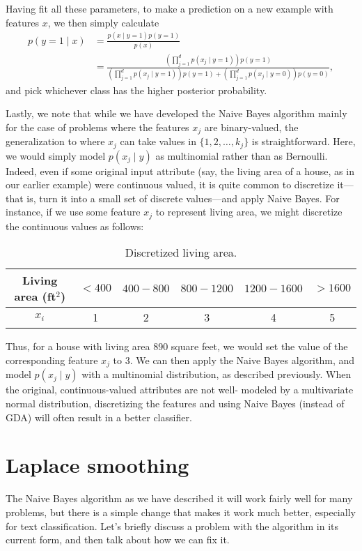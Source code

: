 Having fit all these parameters, to make a prediction on a new example
with features $x$, we then simply calculate
\begin{align}
    p(y = 1 \mid x) &= \frac{p(x \mid y=1)p(y=1)}{p(x)}\\
    &= \frac{\left( \prod_{j=1}^d p(x_j \mid y=1) \right) p(y=1) }{\left( \prod_{j=1}^d p(x_j \mid y=1) \right) p(y=1) + \left( \prod_{j=1}^d p(x_j \mid y=0) \right) p(y=0)},
\end{align}
and pick whichever class has the higher posterior probability.

Lastly, we note that while we have developed the Naive Bayes algorithm
mainly for the case of problems where the features $x_j$ are binary-valued, the
generalization to where $x_j$ can take values in $\{1,2,\ldots,k_j\}$ is straightforward.
Here, we would simply model $p(x_j \mid y)$ as multinomial rather than as Bernoulli.
Indeed, even if some original input attribute (say, the living area of a house,
as in our earlier example) were continuous valued, it is quite common to
discretize it---that is, turn it into a small set of discrete values---and apply
Naive Bayes. For instance, if we use some feature $x_j$ to represent living area,
we might discretize the continuous values as follows:
\begin{table}[!h]
  \centering
  \caption{
    \label{tab:nb_discretize} Discretized living area.
  }
  \begin{tabular}{c|c|c|c|c|c}
    \toprule
    Living area (ft$^2$) & $< 400$ & $400-800$ & $800-1200$ & $1200-1600$ & $> 1600$\\ %
    \midrule
    $x_i$ & 1 & 2 & 3 & 4 & 5\\
    \bottomrule
  \end{tabular}
\end{table}

Thus, for a house with living area 890 square feet, we would set the value
of the corresponding feature $x_j$ to 3. We can then apply the Naive Bayes
algorithm, and model $p(x_j \mid y)$ with a multinomial distribution, as described
previously. When the original, continuous-valued attributes are not well-
modeled by a multivariate normal distribution, discretizing the features and
using Naive Bayes (instead of GDA) will often result in a better classifier.

\section{Laplace smoothing}
The Naive Bayes algorithm as we have described it will work fairly well
for many problems, but there is a simple change that makes it work much
better, especially for text classification. Let's briefly discuss a problem with
the algorithm in its current form, and then talk about how we can fix it.

